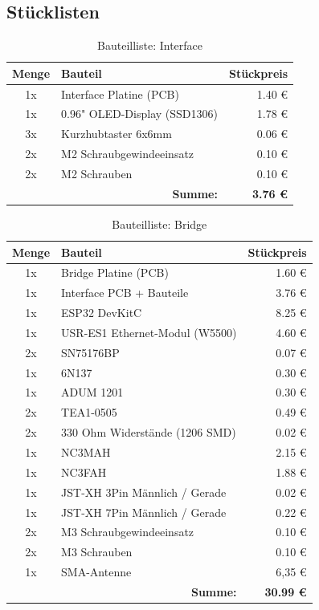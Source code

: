 \subsection{Stücklisten}
\label{subsec:stuecklisten-tabellen}

\begin{table}[H]
    \centering
    \begin{tabular}{|c|l|r|}
        \hline
        \textbf{Menge} & \textbf{Bauteil} & \textbf{Stückpreis} \\ \hline
        1x & Interface Platine (PCB) & 1.40 € \\ \hline
        1x & 0.96" OLED-Display (SSD1306) & 1.78 € \\ \hline
        3x & Kurzhubtaster 6x6mm & 0.06 € \\ \hline
        2x & M2 Schraubgewindeeinsatz & 0.10 € \\ \hline
        2x & M2 Schrauben & 0.10 € \\ \hline
        \multicolumn{2}{|r|}{\textbf{Summe:}} & \textbf{3.76 €} \\ \hline
    \end{tabular}
    \caption{Bauteilliste: Interface}
    \label{tab:bauteile_interface}
\end{table}

\begin{table}[H]
    \centering
    \begin{tabular}{|c|l|r|}
        \hline
        \textbf{Menge} & \textbf{Bauteil} & \textbf{Stückpreis} \\ \hline
        1x & Bridge Platine (PCB) & 1.60 € \\ \hline
        1x & Interface PCB + Bauteile & 3.76 € \\ \hline
        1x & ESP32 DevKitC & 8.25 € \\ \hline
        1x & USR-ES1 Ethernet-Modul (W5500) & 4.60 € \\ \hline
        2x & SN75176BP & 0.07 € \\ \hline
        1x & 6N137 & 0.30 € \\ \hline
        1x & ADUM 1201 & 0.30 € \\ \hline
        2x & TEA1-0505 & 0.49 € \\ \hline
        2x & 330 Ohm Widerstände (1206 SMD) & 0.02 € \\ \hline
        1x & NC3MAH & 2.15 € \\ \hline
        1x & NC3FAH & 1.88 € \\ \hline
        1x & JST-XH 3Pin Männlich / Gerade & 0.02 € \\ \hline
        1x & JST-XH 7Pin Männlich / Gerade & 0.22 € \\ \hline
        2x & M3 Schraubgewindeeinsatz & 0.10 € \\ \hline
        2x & M3 Schrauben & 0.10 € \\ \hline
        1x & SMA-Antenne & 6,35 € \\ \hline
        \multicolumn{2}{|r|}{\textbf{Summe:}} & \textbf{30.99 €} \\ \hline
    \end{tabular}
    \caption{Bauteilliste: Bridge}
    \label{tab:bauteile_bridge}
\end{table}

